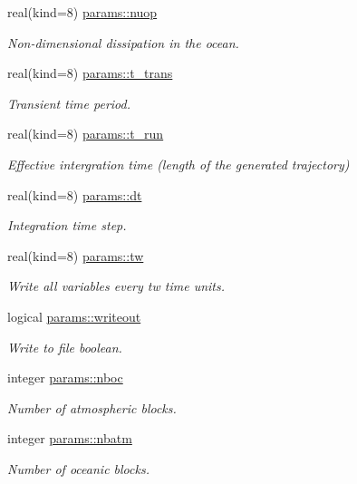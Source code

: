 \begin{DoxyCompactItemize}
real(kind=8) \hyperlink{namespaceparams_a4802663c55680d2c51142f63636abd2e}{params\+::nuop}
\begin{DoxyCompactList}\small\item\em Non-\/dimensional dissipation in the ocean. \end{DoxyCompactList}\item 
real(kind=8) \hyperlink{namespaceparams_aabf0943afa2272a8bbbd58c49ad0db38}{params\+::t\+\_\+trans}
\begin{DoxyCompactList}\small\item\em Transient time period. \end{DoxyCompactList}\item 
real(kind=8) \hyperlink{namespaceparams_a923cab407956c82921069b7ec0e69eb9}{params\+::t\+\_\+run}
\begin{DoxyCompactList}\small\item\em Effective intergration time (length of the generated trajectory) \end{DoxyCompactList}\item 
real(kind=8) \hyperlink{namespaceparams_a2d658dc74d6a45a2e71b06bde97df084}{params\+::dt}
\begin{DoxyCompactList}\small\item\em Integration time step. \end{DoxyCompactList}\item 
real(kind=8) \hyperlink{namespaceparams_a0955c0296092bb15d2dcd120d72ad479}{params\+::tw}
\begin{DoxyCompactList}\small\item\em Write all variables every tw time units. \end{DoxyCompactList}\item 
logical \hyperlink{namespaceparams_affc7b423a975c0e92b62e67ed04edea5}{params\+::writeout}
\begin{DoxyCompactList}\small\item\em Write to file boolean. \end{DoxyCompactList}\item 
integer \hyperlink{namespaceparams_a54123b5a947703d21d0c882dec6780ac}{params\+::nboc}
\begin{DoxyCompactList}\small\item\em Number of atmospheric blocks. \end{DoxyCompactList}\item 
integer \hyperlink{namespaceparams_aa5dc201b0a59d8bb25a5dc52d2ed3cac}{params\+::nbatm}
\begin{DoxyCompactList}\small\item\em Number of oceanic blocks. \end{DoxyCompactList}\item 

\end{DoxyCompactItemize}
